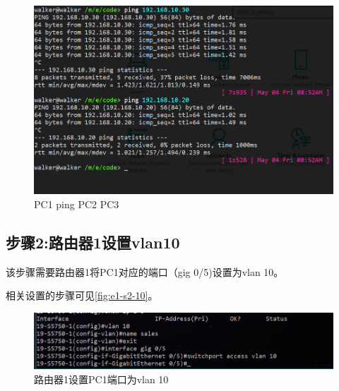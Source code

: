 \documentclass{myreport}
\begin{document}
\begin{figure}[htp]
    \centering
    \includegraphics[width=13cm]{"./figure/2018-05-04-08-53-24.png"}
    \caption{PC1 ping PC2 PC3}
    \label{fig:e1-s1-ping}
\end{figure}

\subsection{步骤2:路由器1设置vlan10}

该步骤需要路由器1将PC1对应的端口（gig 0/5)设置为vlan 10。

相关设置的步骤可见\autoref{fig:e1-s2-10}。

\begin{figure}[htp]
    \centering
    \includegraphics[width=13cm]{"./figure/2018-05-04-09-10-21.png"}
    \caption{路由器1设置PC1端口为vlan 10}
    \label{fig:e1-s2-10}
\end{figure}
\end{document}

